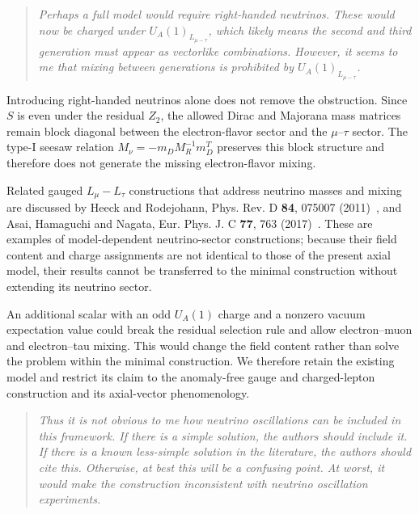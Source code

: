 \documentclass[12pt,a4paper]{article}
\begin{document}
\medskip
{}

\begin{quote}\itshape
Perhaps a full model would require right-handed neutrinos. These would now be charged under \(U_A(1)_{L_{\mu-\tau}}\), which likely means the second and third generation must appear as vectorlike combinations. However, it seems to me that mixing between generations is prohibited by \(U_A(1)_{L_{\mu-\tau}}\).
\end{quote}


Introducing right-handed neutrinos alone does not remove the obstruction. Since \(S\) is even under the residual \(Z_2\), the allowed Dirac and Majorana mass matrices remain block diagonal between the electron-flavor sector and the \(\mu\)--\(\tau\) sector. The type-I seesaw relation \(M_\nu=-m_D M_R^{-1}m_D^T\) preserves this block structure and therefore does not generate the missing electron-flavor mixing.

Related gauged \(L_\mu-L_\tau\) constructions that address neutrino masses and mixing are discussed by Heeck and Rodejohann, Phys. Rev. D \textbf{84}, 075007 (2011)~\cite{Heeck:2011wj}, and Asai, Hamaguchi and Nagata, Eur. Phys. J. C \textbf{77}, 763 (2017)~\cite{Asai:2017ryy}. These are examples of model-dependent neutrino-sector constructions; because their field content and charge assignments are not identical to those of the present axial model, their results cannot be transferred to the minimal construction without extending its neutrino sector.

An additional scalar with an odd \(U_A(1)\) charge and a nonzero vacuum expectation value could break the residual selection rule and allow electron--muon and electron--tau mixing. This would change the field content rather than solve the problem within the minimal construction. We therefore retain the existing model and restrict its claim to the anomaly-free gauge and charged-lepton construction and its axial-vector phenomenology.

\medskip
{}

\begin{quote}\itshape
Thus it is not obvious to me how neutrino oscillations can be included in this framework. If there is a simple solution, the authors should include it. If there is a known less-simple solution in the literature, the authors should cite this. Otherwise, at best this will be a confusing point. At worst, it would make the construction inconsistent with neutrino oscillation experiments.
\end{quote}
\end{document}
